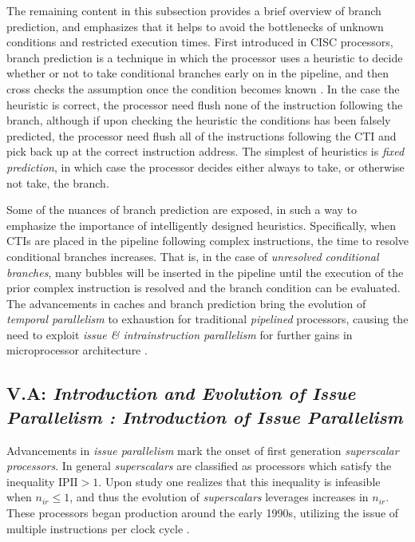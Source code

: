 \documentclass{article}
\begin{document}
The remaining content in this subsection provides a brief overview of branch prediction, and emphasizes that it helps to avoid the bottlenecks of unknown conditions and restricted execution times. 
First introduced in CISC processors, branch prediction is a technique in which the processor uses a heuristic to decide whether or not to take conditional branches early on in the pipeline, and then cross checks the assumption once the condition becomes known \cite{Sima}.
In the case the heuristic is correct, the processor need flush none of the instruction following the branch, although if upon checking the heuristic the conditions has been falsely predicted, the processor need flush all of the instructions following the CTI and pick back up at the correct instruction address. 
The simplest of heuristics is \emph{fixed prediction}, in which case the processor decides either always to take, or otherwise not take, the branch. 

Some of the nuances of branch prediction are exposed, in such a way to emphasize the importance of intelligently designed heuristics.
Specifically, when CTIs are placed in the pipeline following complex instructions, the time to resolve conditional branches increases. 
That is, in the case of \emph{unresolved conditional branches}, many bubbles will be inserted in the pipeline until the execution of the prior complex instruction is resolved and the branch condition can be evaluated. 
The advancements in caches and branch prediction bring the evolution of \emph{temporal parallelism} to exhaustion for traditional \emph{pipelined} processors, causing the need to exploit \emph{issue \& intrainstruction parallelism} for further gains in microprocessor architecture \cite{Sima}.

\subsection{\textbf{V.A}: \emph{Introduction and Evolution of Issue Parallelism : Introduction of Issue Parallelism}}
Advancements in \emph{issue parallelism} mark the onset of first generation \emph{superscalar processors}. 
In general \emph{superscalars} are classified as processors which satisfy the inequality $\text{IPII} > 1$. 
Upon study one realizes that this inequality is infeasible when $n_{ir} \le 1$, and thus the evolution of \emph{superscalars} leverages increases in $n_{ir}$.
These processors began production around the early 1990s, utilizing the issue of multiple instructions per clock cycle \cite{Sima}. 
\end{document}
